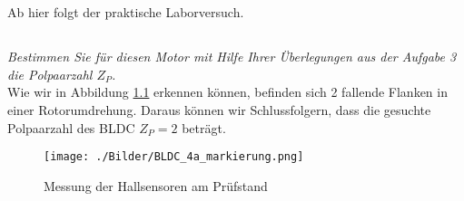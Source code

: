 \chapter{}\label{ch:auf4}
Ab hier folgt der praktische Laborversuch.

\section{}\label{sec:4a}
\textit{Bestimmen Sie für diesen Motor mit Hilfe Ihrer Überlegungen aus der Aufgabe 3 die Polpaarzahl $ Z_{P} $.} \\
Wie wir in Abbildung \ref{fig:4a:flanken} erkennen können, befinden sich 2 fallende Flanken in einer Rotorumdrehung. Daraus können wir Schlussfolgern, dass die gesuchte Polpaarzahl des BLDC $ Z_{P} = 2  $ beträgt.
\begin{figure}
	\centering
	\texttt{[image: ./Bilder/BLDC\_4a\_markierung.png]}
	\caption{Messung der Hallsensoren am Prüfstand}
	\label{fig:4a:flanken}
\end{figure}

